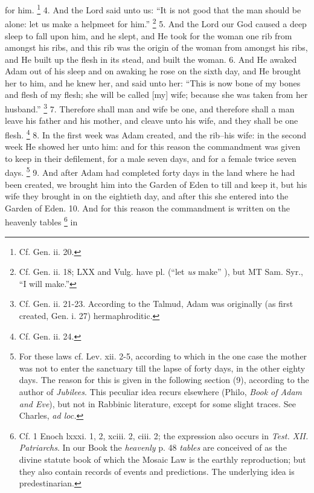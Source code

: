 for him. \footnote{Cf. Gen. ii. 20.} 4. And the Lord said unto us: ``It is not good that the man should be alone: let us make a helpmeet for him.'' \footnote{Cf. Gen. ii. 18; LXX and Vulg. have pl. (``let \emph{us} make'' ), but MT Sam. Syr., ``I will make.''} 5. And the Lord our God caused a deep sleep to fall upon him, and he slept, and He took for the woman one rib from amongst his ribs, and this rib was the origin of the woman from amongst his ribs, and He built up the flesh in its stead, and built the woman. 6. And He awaked Adam out of his sleep and on awaking he rose on the sixth day, and He brought her to him, and he knew her, and said unto her: ``This is now bone of my bones and flesh of my flesh; she will be called [my] wife; because she was taken from her husband.'' \footnote{Cf. Gen. ii. 21-23. According to the Talmud, Adam was originally (as first created, Gen. i. 27) hermaphroditic.} 7. Therefore shall man and wife be one, and therefore shall a man leave his father and his mother, and cleave unto his wife, and they shall be one flesh. \footnote{Cf. Gen. ii. 24.} 8. In the first week was Adam created, and the rib--his wife: in the second week He showed her unto him: and for this reason the commandment was given to keep in their defilement, for a male seven days, and for a female twice seven days. \footnote{For these laws cf. Lev. xii. 2-5, according to which in the one case the mother was not to enter the sanctuary till the lapse of forty days, in the other eighty days. The reason for this is given in the following section (9), according to the author of \emph{Jubilees}. This peculiar idea recurs elsewhere (Philo, \emph{Book of Adam and Eve}), but not in Rabbinic literature, except for some slight traces. See Charles, \emph{ad loc.}} 9. And after Adam had completed forty days in the land where he had been created, we brought him into the Garden of Eden to till and keep it, but his wife they brought in on the eightieth day, and after this she entered into the Garden of Eden. 10. And for this reason the commandment is written on the heavenly tables \footnote{Cf. 1 Enoch lxxxi. 1, 2, xciii. 2, ciii. 2; the expression also occurs in \emph{Test. XII. Patriarchs}. In our Book the \emph{heavenly} p. 48 \emph{tables} are conceived of as the divine statute book of which the Mosaic Law is the earthly reproduction; but they also contain records of events and predictions. The underlying idea is predestinarian.} in

